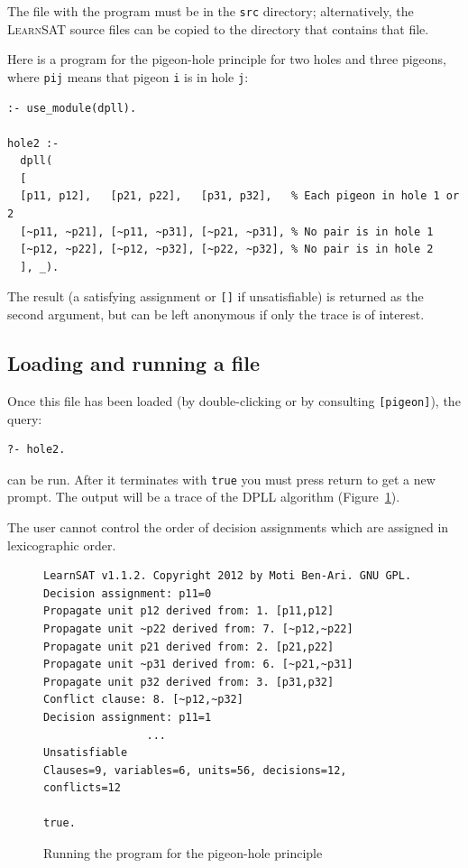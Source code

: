 \documentclass[11pt]{report}
\newcommand*{\p}[1]{\textup{\texttt{#1}}}
\newcommand*{\ls}{\textsc{LearnSAT}}
\begin{document}
The file with the program must be in the \p{src} directory;
alternatively, the \ls{} source files can be copied to the directory
that contains that file.

Here is a program for the pigeon-hole principle for two holes and three
pigeons, where \p{pij} means that pigeon \p{i} is in hole \p{j}:

\begin{verbatim}
:- use_module(dpll).

hole2 :-
  dpll(
  [
  [p11, p12],   [p21, p22],   [p31, p32],   % Each pigeon in hole 1 or 2 
  [~p11, ~p21], [~p11, ~p31], [~p21, ~p31], % No pair is in hole 1
  [~p12, ~p22], [~p12, ~p32], [~p22, ~p32], % No pair is in hole 2
  ], _).
\end{verbatim}

The result (a satisfying assignment or \p{[]} if unsatisfiable) is
returned as the second argument, but can be left anonymous if only
the trace is of interest.

\subsection{Loading and running a file}

Once this file has been loaded (by double-clicking or by consulting
\p{[pigeon]}), the query:
\begin{verbatim}
?- hole2. 
\end{verbatim}

can be run. After it terminates with \p{true} you must press
return to get a new prompt. The output will be a trace of the DPLL
algorithm (Figure~\ref{fig.pigeon}).

The user cannot control the order of decision assignments which are
assigned in lexicographic order.

\begin{figure}[tbp]
\begin{verbatim}
LearnSAT v1.1.2. Copyright 2012 by Moti Ben-Ari. GNU GPL.
Decision assignment: p11=0
Propagate unit p12 derived from: 1. [p11,p12]
Propagate unit ~p22 derived from: 7. [~p12,~p22]
Propagate unit p21 derived from: 2. [p21,p22]
Propagate unit ~p31 derived from: 6. [~p21,~p31]
Propagate unit p32 derived from: 3. [p31,p32]
Conflict clause: 8. [~p12,~p32]
Decision assignment: p11=1
                ...
Unsatisfiable
Clauses=9, variables=6, units=56, decisions=12, conflicts=12

true.
\end{verbatim}
\caption{Running the program for the pigeon-hole principle}\label{fig.pigeon}
\end{figure}
\end{document}
